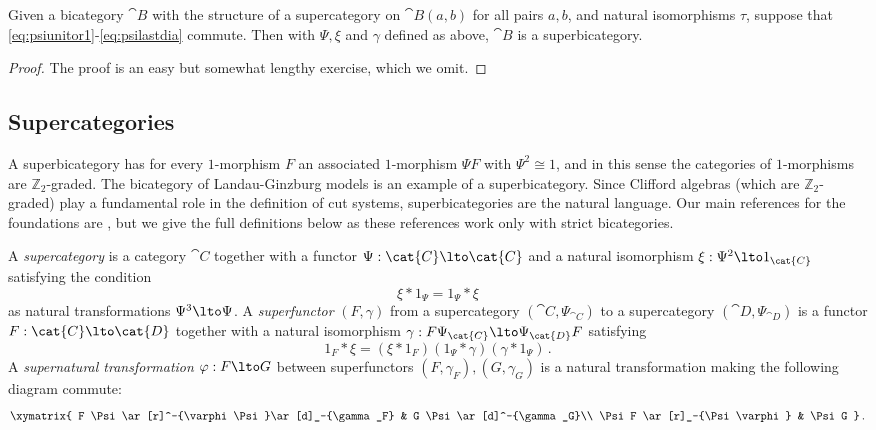 \begin{lemma}\label{lemma:constructingsuper}
Given a bicategory $\cat{B}$ with the structure of a supercategory on $\cat{B}(a,b)$ for all pairs $a,b$, and natural isomorphisms $\tau$, suppose that \eqref{eq:psiunitor1}-\eqref{eq:psilastdia} commute. Then with $\Psi, \xi$ and $\gamma$ defined as above, $\cat{B}$ is a superbicategory.
\end{lemma}
\begin{proof}
The proof is an easy but somewhat lengthy exercise, which we omit.
\end{proof}

\subsection{Supercategories}

A superbicategory has for every $1$-morphism $F$ an associated $1$-morphism $\Psi F$ with $\Psi^2 \cong 1$, and in this sense the categories of $1$-morphisms are $\mathbb{Z}_2$-graded. The bicategory of Landau-Ginzburg models is an example of a superbicategory. Since Clifford algebras (which are $\mathbb{Z}_2$-graded) play a fundamental role in the definition of cut systems, superbicategories are the natural language. Our main references for the foundations are \cite{ellis_lauda,kang,kang2}, but we give the full definitions below as these references work only with strict bicategories.

\begin{definition} A \emph{supercategory} is a category $\cat{C}$ together with a functor $\Psi: \cat{C} \lto \cat{C}$ and a natural isomorphism $\xi: \Psi^2 \lto 1_{\cat{C}}$ satisfying the condition
\[
\xi * 1_{\Psi} = 1_{\Psi} * \xi
\]
as natural transformations $\Psi^3 \lto \Psi$. A \emph{superfunctor} $(F, \gamma)$ from a supercategory $(\cat{C}, \Psi_{\cat{C}})$ to a supercategory $(\cat{D}, \Psi_{\cat{D}})$ is a functor $F: \cat{C} \lto \cat{D}$ together with a natural isomorphism $\gamma: F \Psi_{\cat{C}} \lto \Psi_{\cat{D}} F$ satisfying
\[
1_F * \xi = (\xi * 1_F ) ( 1_{\Psi} * \gamma ) ( \gamma * 1_{\Psi} )\,.
\]
A \emph{supernatural transformation} $\varphi: F \lto G$ between superfunctors $(F,\gamma_F), (G,\gamma_G)$ is a natural transformation making the following diagram commute:
\[
\xymatrix{
F \Psi \ar[r]^-{\varphi \Psi}\ar[d]_-{\gamma_F} & G \Psi \ar[d]^-{\gamma_G}\\
\Psi F \ar[r]_-{\Psi \varphi} & \Psi G
}\,.
\] 
\end{definition}

